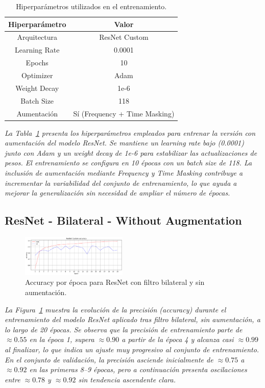 \documentclass[conference]{IEEEtran}
\begin{document}
\begin{table}[H]
    \centering
    \begin{tabular}{|c|c|}
        \hline
        \textbf{Hiperparámetro} & \textbf{Valor} \\
        \hline
        Arquitectura    & ResNet Custom \\
        Learning Rate   & 0.0001        \\
        Epochs          & 10            \\
        Optimizer       & Adam          \\
        Weight Decay    & 1e-6          \\
        Batch Size      & 118           \\
        Aumentación     & Sí (Frequency + Time Masking) \\
        \hline
    \end{tabular}
    \caption{Hiperparámetros utilizados en el entrenamiento.}
    \label{tab:resnet_raw_with_hparams}
\end{table}
\noindent\textit{%
La Tabla~\ref{tab:resnet_raw_with_hparams} presenta los hiperparámetros empleados para entrenar la versión con aumentación del modelo ResNet. Se mantiene un learning rate bajo (0.0001) junto con Adam y un weight decay de 1e-6 para estabilizar las actualizaciones de pesos. El entrenamiento se configura en 10 épocas con un batch size de 118. La inclusión de aumentación mediante Frequency y Time Masking contribuye a incrementar la variabilidad del conjunto de entrenamiento, lo que ayuda a mejorar la generalización sin necesidad de ampliar el número de épocas.
}

\subsection{ResNet - Bilateral - Without Augmentation}

\begin{figure}[H]
    \centering
    \includegraphics[width=0.45\textwidth]{graphics-resnet-bilateral/resnet_bilateral_without_accuracy.png}
    \caption{Accuracy por época para ResNet con filtro bilateral y sin aumentación.}
    \label{fig:resnet_bilateral_without_accuracy}
\end{figure}
\noindent\textit{%
La Figura~\ref{fig:resnet_bilateral_without_accuracy} muestra la evolución de la precisión (accuracy) durante el entrenamiento del modelo ResNet aplicado tras filtro bilateral, sin aumentación, a lo largo de 20 épocas. Se observa que la precisión de entrenamiento parte de \(\approx0.55\) en la época 1, supera \(\approx0.90\) a partir de la época 4 y alcanza casi \(\approx0.99\) al finalizar, lo que indica un ajuste muy progresivo al conjunto de entrenamiento. En el conjunto de validación, la precisión asciende inicialmente de \(\approx0.75\) a \(\approx0.92\) en las primeras 8–9 épocas, pero a continuación presenta oscilaciones entre \(\approx0.78\) y \(\approx0.92\) sin tendencia ascendente clara. 
}
\end{document}
